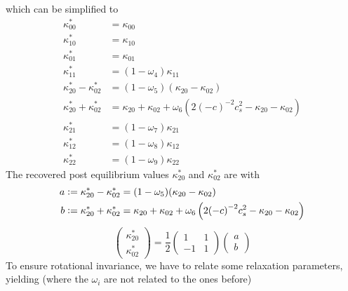 \documentclass{article}
\begin{document}
which can be simplified to
\begin{equation}
  \begin{aligned}
    \kappa_{00}^{*} & = \kappa_{00} \\
    \kappa_{10}^{*} & = \kappa_{10} \\
    \kappa_{01}^{*} & = \kappa_{01} \\
    \kappa_{11}^{*} & = (1-\omega_4)\kappa_{11} \\
    \kappa_{20}^{*} - \kappa_{02}^{*}
      & = (1-\omega_5) (\kappa_{20} - \kappa_{02}) \\
    \kappa_{20}^{*} + \kappa_{02}^{*}
      & = \kappa_{20} + \kappa_{02} + \omega_6 \left( 2 {(-c)}^{-2} c_s^2 - \kappa_{20} - \kappa_{02} \right) \\
    \kappa_{21}^{*} & = (1-\omega_7)\kappa_{21} \\
    \kappa_{12}^{*} & = (1-\omega_8)\kappa_{12} \\
    \kappa_{22}^{*} & = (1-\omega_9)\kappa_{22}
  \end{aligned}
\end{equation}
%
The recovered post equilibrium values $\kappa_{20}^{*}$ and $\kappa_{02}^{*}$ are with
\begin{equation}
  \begin{aligned}
    a \mathrel{\mathop:}= \kappa_{20}^{*} - \kappa_{02}^{*}
      & = (1-\omega_5) (\kappa_{20} - \kappa_{02}) \\
    b \mathrel{\mathop:}= \kappa_{20}^{*} + \kappa_{02}^{*}
      & = \kappa_{20} + \kappa_{02} + \omega_6 \left( 2 {(-c)}^{-2} c_s^2 - \kappa_{20} - \kappa_{02} \right)
  \end{aligned}
\end{equation}
\begin{equation}
  \begin{pmatrix}
    \kappa_{20}^{*} \\
    \kappa_{02}^{*}
  \end{pmatrix}
  = \frac{1}{2}
  \begin{pmatrix}
    1 & 1 \\ -1 & 1
  \end{pmatrix}
  \begin{pmatrix}
    a\\
    b
  \end{pmatrix}
\end{equation}
To ensure rotational invariance, we have to relate some relaxation parameters, yielding (where the $\omega_i$ are not related to the ones before)
\end{document}
